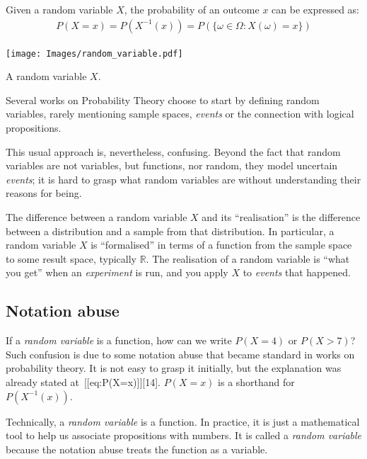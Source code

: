 \documentclass[
  letterpaper,
  12pt,
  british]{tufte-book}
\theoremstyle{plain}
\theoremstyle{plain}
\theoremstyle{definition}
\theoremstyle{remark}
\begin{document}
Given a random variable \(\mathit{X}\), the probability of an outcome
\(\mathit{x}\) can be expressed as: \begin{align}
    P(\mathit{X}=\mathit{x}) = P(\mathit{X}^{-1}(\mathit{x})) = P(\{\omega \in \Omega: \mathit{X}(\omega)=\mathit{x}\})\label{eq:P(X=x)} 
\end{align}

\begin{marginfigure}

{\centering \texttt{[image: Images/random\_variable.pdf]}

}

\caption{\label{fig-random_variable}A random variable \(X\).}

\end{marginfigure}

Several works on Probability Theory choose to start by defining random
variables, rarely mentioning sample spaces, \emph{events} or the
connection with logical propositions.

This usual approach is, nevertheless, confusing. Beyond the fact that
random variables are not variables, but functions, nor random, they
model uncertain \emph{events}; it is hard to grasp what random variables
are without understanding their reasons for being.

The difference between a random variable \(\mathit{X}\) and its
``realisation'' is the difference between a distribution and a sample
from that distribution. In particular, a random variable \(\mathit{X}\)
is ``formalised'' in terms of a function from the sample space to some
result space, typically \(\mathbb{R}\). The realisation of a random
variable is ``what you get'' when an \emph{experiment} is run, and you
apply \(\mathit{X}\) to \emph{events} that happened.

\hypertarget{notation-abuse}{%
\subsection{Notation abuse}\label{notation-abuse}}

If a \emph{random variable} is a function, how can we write
\(P(\mathit{X}=4)\) or \(P(\mathit{X}> 7)\)? Such confusion is due to
some notation abuse that became standard in works on probability theory.
It is not easy to grasp it initially, but the explanation was already
stated at~{[}{[}eq:P(X=x){]}{]}{[}14{]}. \(P(\mathit{X}=\mathit{x})\) is
a shorthand for \(P(\mathit{X}^{-1}(\mathit{x}))\).

Technically, a \emph{random variable} is a function. In practice, it is
just a mathematical tool to help us associate propositions with numbers.
It is called a \emph{random variable} because the notation abuse treats
the function as a variable.
\end{document}
